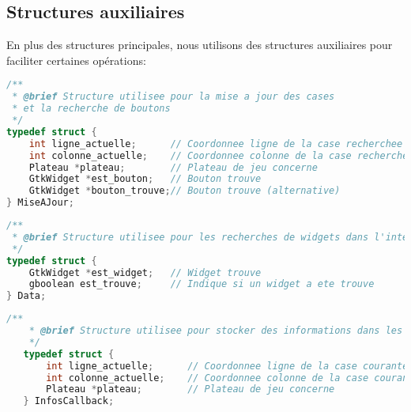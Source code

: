 \subsection{Structures auxiliaires}

En plus des structures principales, nous utilisons des structures auxiliaires pour faciliter certaines opérations:

\begin{lstlisting}[language=C, caption=Structure MiseAJour]
/**
 * @brief Structure utilisee pour la mise a jour des cases 
 * et la recherche de boutons
 */
typedef struct {
    int ligne_actuelle;      // Coordonnee ligne de la case recherchee
    int colonne_actuelle;    // Coordonnee colonne de la case recherchee
    Plateau *plateau;        // Plateau de jeu concerne
    GtkWidget *est_bouton;   // Bouton trouve
    GtkWidget *bouton_trouve;// Bouton trouve (alternative)
} MiseAJour;
\end{lstlisting}

\begin{lstlisting}[language=C, caption=Structure Data]
/**
 * @brief Structure utilisee pour les recherches de widgets dans l'interface
 */
typedef struct {
    GtkWidget *est_widget;   // Widget trouve
    gboolean est_trouve;     // Indique si un widget a ete trouve
} Data;
\end{lstlisting}

\begin{lstlisting}[language=C, caption=Structure InfosCallback]
   /**
    * @brief Structure utilisee pour stocker des informations dans les callbacks
    */
   typedef struct {
       int ligne_actuelle;      // Coordonnee ligne de la case courante
       int colonne_actuelle;    // Coordonnee colonne de la case courante
       Plateau *plateau;        // Plateau de jeu concerne
   } InfosCallback;
   \end{lstlisting}